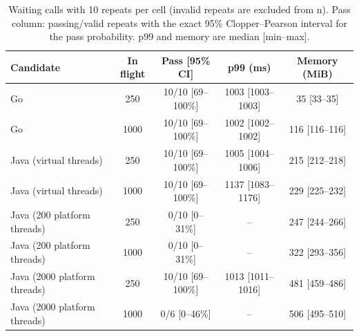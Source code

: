 \begin{table}[t]
\caption{Waiting calls with 10 repeats per cell (invalid repeats are excluded from n). Pass column: passing/valid repeats with the exact 95\% Clopper--Pearson interval for the pass probability. p99 and memory are median [min--max].}
\label{tab:repeatspark}
\centering\small
\begin{tabular}{lcccc}
\toprule
Candidate & In flight & Pass [95\% CI] & p99 (ms) & Memory (MiB) \\
\midrule
Go & 250 & 10/10 [69--100\%] & 1003 [1003--1003] & 35 [33--35] \\
Go & 1000 & 10/10 [69--100\%] & 1002 [1002--1002] & 116 [116--116] \\
Java (virtual threads) & 250 & 10/10 [69--100\%] & 1005 [1004--1006] & 215 [212--218] \\
Java (virtual threads) & 1000 & 10/10 [69--100\%] & 1137 [1083--1176] & 229 [225--232] \\
Java (200 platform threads) & 250 & 0/10 [0--31\%] & -- & 247 [244--266] \\
Java (200 platform threads) & 1000 & 0/10 [0--31\%] & -- & 322 [293--356] \\
Java (2000 platform threads) & 250 & 10/10 [69--100\%] & 1013 [1011--1016] & 481 [459--486] \\
Java (2000 platform threads) & 1000 & 0/6 [0--46\%] & -- & 506 [495--510] \\
\bottomrule
\end{tabular}
\end{table}
